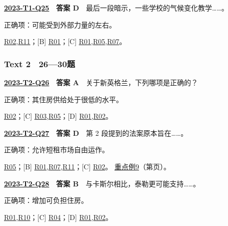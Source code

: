 \documentclass[11pt,a4paper]{article}
\begin{document}
\par\smallskip
{}\label{idx-2023-T1-Q25}
\noindent\textbf{\href{https://zj139.github.io/math-notes/english/e1f5e5e385028dfa952ef339/\#q25}{2023-T1-Q25}　答案 D}　最后一段暗示，一些学校的气候变化教学……。\par\nopagebreak
\noindent 正确项：可能受到外部力量的左右。\par\nopagebreak
\noindent [A] \hyperref[cat-R02]{R02},\hyperref[cat-R11]{R11}；[B] \hyperref[cat-R01]{R01}；[C] \hyperref[cat-R01]{R01},\hyperref[cat-R05]{R05},\hyperref[cat-R07]{R07}。
\par\smallskip
\subsubsection{Text 2　26—30题}
\label{idx-2023-T2-Q26}
\noindent\textbf{\href{https://zj139.github.io/math-notes/english/7985b9c2edc65f70cf714232/\#q26}{2023-T2-Q26}　答案 A}　关于新英格兰，下列哪项是正确的？\par\nopagebreak
\noindent 正确项：其住房供给处于很低的水平。\par\nopagebreak
\noindent [B] \hyperref[cat-R02]{R02}；[C] \hyperref[cat-R03]{R03},\hyperref[cat-R05]{R05}；[D] \hyperref[cat-R01]{R01},\hyperref[cat-R02]{R02}。
\par\smallskip
{}\label{idx-2023-T2-Q27}
\noindent\textbf{\href{https://zj139.github.io/math-notes/english/7985b9c2edc65f70cf714232/\#q27}{2023-T2-Q27}　答案 D}　第 2 段提到的法案原本旨在……。\par\nopagebreak
\noindent 正确项：允许短租市场自由运作。\par\nopagebreak
\noindent [A] \hyperref[cat-R05]{R05}；[B] \hyperref[cat-R01]{R01},\hyperref[cat-R07]{R07},\hyperref[cat-R11]{R11}；[C] \hyperref[cat-R02]{R02}。
\hyperref[case-2023-T2-Q27]{重点例9}（第\pageref{case-2023-T2-Q27}页）。
\par\smallskip
{}\label{idx-2023-T2-Q28}
\noindent\textbf{\href{https://zj139.github.io/math-notes/english/7985b9c2edc65f70cf714232/\#q28}{2023-T2-Q28}　答案 B}　与卡斯尔相比，泰勒更可能支持……。\par\nopagebreak
\noindent 正确项：增加可负担住房。\par\nopagebreak
\noindent [A] \hyperref[cat-R01]{R01},\hyperref[cat-R10]{R10}；[C] \hyperref[cat-R04]{R04}；[D] \hyperref[cat-R01]{R01},\hyperref[cat-R02]{R02}。
\par\smallskip
\end{document}
